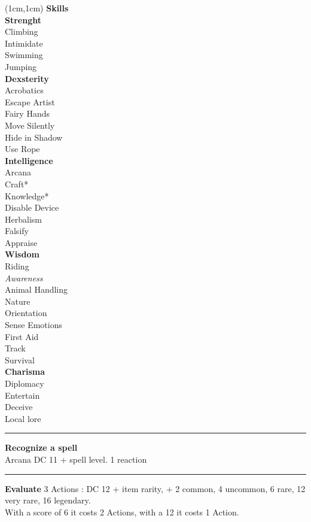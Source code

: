 \documentclass[a4paper,12 pt,openany]{book}
\newcommand{\linex}{\rule{\textwidth}{0.4pt}}
\begin{document}
\begin{textblock*}{4cm}(1cm,1cm) %
{\textbf{Skills}\\
	
\textbf{Strenght}	\\
Climbing\\
Intimidate\\
Swimming\\
Jumping\\
\textbf{Dexsterity}\\
Acrobatics\\
Escape Artist\\
Fairy Hands\\
Move Silently\\
Hide in Shadow\\
Use Rope\\
\textbf{Intelligence}\\
Arcana\\
Craft*\\
Knowledge*\\
Disable Device\\
Herbalism\\
Falsify\\
Appraise\\
\textbf{Wisdom}\\
Riding\\
\textit{Awareness}\\
Animal Handling\\
Nature\\
Orientation\\
Sense Emotions\\
First Aid\\
Track\\
Survival\\
\textbf{Charisma}\\
Diplomacy\\
Entertain\\
Deceive\\
Local lore\\
}

\linex

\textbf{Recognize a spell}\\ Arcana DC 11 + spell level. 1 reaction

\linex

\textbf{Evaluate} 3 Actions : DC 12 + item rarity, + 2 common, 4 uncommon, 6 rare, 12 very rare, 16 legendary. \\
With a score of 6 it costs 2 Actions, with a 12 it costs 1 Action.

\end{textblock*}
\end{document}
